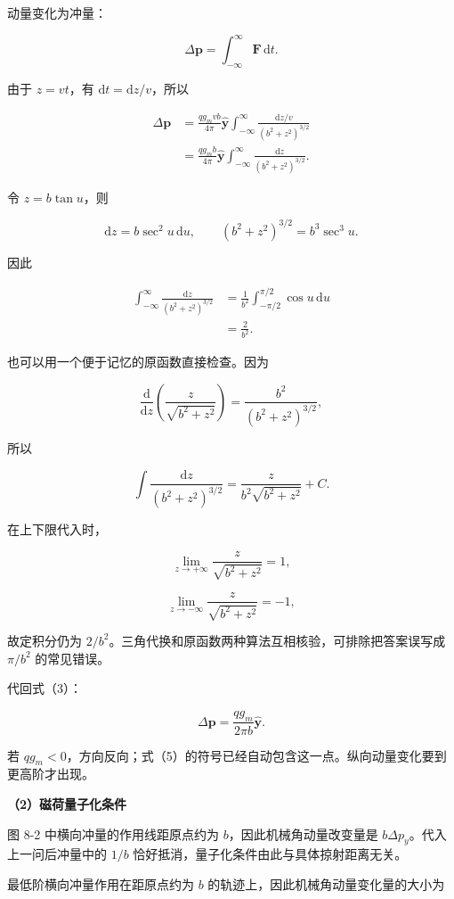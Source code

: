 \documentclass[12pt,a4paper,UTF8]{ctexart}
\begin{document}
动量变化为冲量：

\[\Delta\boldsymbol p=\int_{-\infty}^{\infty}\boldsymbol F\,\mathrm dt.\]

由于 \(z=vt\)，有 \(\mathrm dt=\mathrm dz/v\)，所以

\[\begin{aligned}
\Delta\boldsymbol p
&=\frac{qg_mvb}{4\pi}\hat{\boldsymbol y}
\int_{-\infty}^{\infty}
\frac{\mathrm dz/v}{(b^2+z^2)^{3/2}}\\
&=\frac{qg_mb}{4\pi}\hat{\boldsymbol y}
\int_{-\infty}^{\infty}
\frac{\mathrm dz}{(b^2+z^2)^{3/2}}.
\end{aligned} \tag{3}\]

令 \(z=b\tan u\)，则

\[\mathrm dz=b\sec^2u\,\mathrm du,\qquad
(b^2+z^2)^{3/2}=b^3\sec^3u.\]

因此

\[\begin{aligned}
\int_{-\infty}^{\infty}
\frac{\mathrm dz}{(b^2+z^2)^{3/2}}
&=\frac1{b^2}\int_{-\pi/2}^{\pi/2}\cos u\,\mathrm du\\
&=\frac2{b^2}.
\end{aligned} \tag{4}\]

也可以用一个便于记忆的原函数直接检查。因为

\[\frac{\mathrm d}{\mathrm dz}
\left(\frac{z}{\sqrt{b^2+z^2}}\right)
=\frac{b^2}{(b^2+z^2)^{3/2}},\]

所以

\[\int\frac{\mathrm dz}{(b^2+z^2)^{3/2}}
=\frac{z}{b^2\sqrt{b^2+z^2}}+C.\]

在上下限代入时，

\[\lim_{z\to+\infty}\frac{z}{\sqrt{b^2+z^2}}=1,\]

\[\lim_{z\to-\infty}\frac{z}{\sqrt{b^2+z^2}}=-1,\]

故定积分仍为
\(2/b^2\)。三角代换和原函数两种算法互相核验，可排除把答案误写成
\(\pi/b^2\) 的常见错误。

代回式（3）：

\[\boxed{
\Delta\boldsymbol p
=\frac{qg_m}{2\pi b}\hat{\boldsymbol y}
}. \tag{5}\]

若
\(qg_m<0\)，方向反向；式（5）的符号已经自动包含这一点。纵向动量变化要到更高阶才出现。

\textbf{（2）磁荷量子化条件}

图 8-2 中横向冲量的作用线距原点约为 \(b\)，因此机械角动量改变量是
\(b\Delta p_y\)。代入上一问后冲量中的 \(1/b\)
恰好抵消，量子化条件由此与具体掠射距离无关。

最低阶横向冲量作用在距原点约为 \(b\)
的轨迹上，因此机械角动量变化量的大小为
\end{document}
